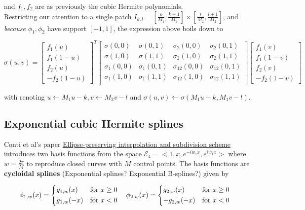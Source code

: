 \documentclass[a4paper, 11pt]{article}
\begin{document}
and $f_1, f_2$ are as previously the cubic Hermite polynomials. \\ 

Restricting our attention to a single patch $I_{k,l} = [\frac{k}{M_1}, \frac{k+1}{M_1}]\times[\frac{l}{M_2}, 
\frac{l+1}{M_2}]$, and \emph{because} $\phi_1, \phi_2$ have support $[-1,1]$, the expression above boils down to

\begin{equation}
  \boxed{\sigma(u, v) = \begin{bmatrix} f_1(u) \\ f_1(1-u) \\  f_2(u) \\ - f_2(1-u) \end{bmatrix}^T
  \begin{bmatrix}
    \sigma(0,0) & \sigma(0,1) & \sigma_2(0,0) & \sigma_2(0,1) \\
    \sigma(1,0) & \sigma(1,1) & \sigma_2(1,0) & \sigma_2(1,1) \\
    \sigma_1(0,0) & \sigma_1(0,1) & \sigma_{12}(0,0) & \sigma_{12}(0,1) \\
    \sigma_1(1,0) & \sigma_1(1,1) & \sigma_{12}(1,0) & \sigma_{12}(1,1) \\
  \end{bmatrix}
  \begin{bmatrix} f_1(v) \\ f_1(1-v) \\ f_2(v) \\ -f_2(1-v) \end{bmatrix}}
\end{equation}

with renoting $u \leftarrow M_1u-k, v \leftarrow M_2v-l$ and $\sigma(u,v) \leftarrow \sigma(M_1u-k, M_1v-l)$.

\subsection{Exponential cubic Hermite splines}

Conti et al's paper \underline{Ellipse-preserving interpolation and subdivision scheme} introduces two basis functions 
from the space $\mathcal{E}_4 = <1, x, e^{-iw_1x}, e^{iw_1x}>$ where $w = \frac{2\pi}{M}$ to reproduce closed curves 
with $M$ control points. The basis functions are \textbf{cycloidal splines} (Exponential splines? Exponential 
B-splines?) given by

\begin{equation}
  \phi_{1, w}(x) =
  \begin{dcases}
    g_{1, w}(x) &\text{for } x \geq 0 \\
    g_{1, w}(-x) &\text{for } x < 0\\
  \end{dcases} \quad
  \hfill
  \phi_{2, w}(x) =
  \begin{dcases}
    g_{2, w}(x) &\text{for } x \geq 0 \\
    -g_{2, w}(-x) &\text{for } x < 0\\
  \end{dcases} \quad
\end{equation}
\end{document}
